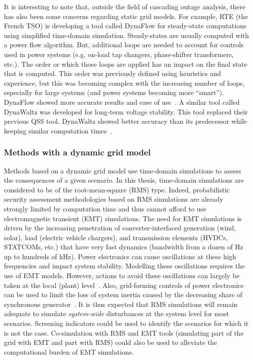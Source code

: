 It is interesting to note that, outside the field of cascading outage analysis, there has also been some concerns regarding static grid models. For example, RTE (the French TSO) is developing a tool called DynaFlow for steady-state computations using simplified time-domain simulation. Steady-states are usually computed with a power flow algorithm. But, additional loops are needed to account for controls used in power systems (e.g. on-load tap changers, phase-shifter transformers, etc.). The order or which those loops are applied has an impact on the final state that is computed. This order was previously defined using heuristics and experience, but this was becoming complex with the increasing number of loops, especially for large systems (and power systems becoming more ``smart''). DynaFlow showed more accurate results and ease of use~\cite{DynaFlow}. A similar tool called DynaWaltz was developed for long-term voltage stability. This tool replaced their previous QSS tool. DynaWaltz showed better accuracy than its predecessor while keeping similar computation times~\cite{DynaWaltz}.



\subsubsection{Methods with a dynamic grid model}
\label{sec:DynMethods}

Methods based on a dynamic grid model use time-domain simulations to assess the consequences of a given scenario. In this thesis, time-domain simulations are considered to be of the root-mean-square (RMS) type. Indeed, probabilistic security assessment methodologies based on RMS simulations are already strongly limited by computation time and thus cannot afford to use electromagnetic transient (EMT) simulations. The need for EMT simulations is driven by the increasing penetration of converter-interfaced generation (wind, solar), load (electric vehicle chargers), and transmission elements (HVDCs, STATCOMs, etc.) that have very fast dynamics (bandwidth from a dozen of Hz up to hundreds of kHz). Power electronics can cause oscillations at these high frequencies and impact system stability. Modelling these oscillations requires the use of EMT models. However, actions to avoid these oscillations can largely be taken at the local (plant) level~\cite{AvoidEMT}. Also, grid-forming controls of power electronics can be used to limit the loss of system inertia caused by the decreasing share of synchronous generator~\cite{GridFormingAreTheyTheKey}. It is thus expected that RMS simulations will remain adequate to simulate \emph{system-wide} disturbances at the system level for most scenarios. Screening indicators could be used to identify the scenarios for which it is not the case. Co-simulation with RMS and EMT tools (simulating part of the grid with EMT and part with RMS) could also be used to alleviate the computational burden of EMT simulations.


